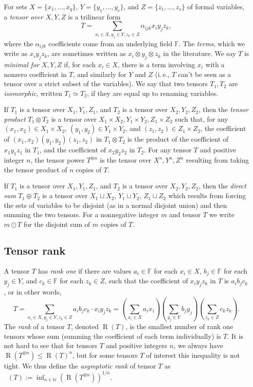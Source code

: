 \documentclass[11pt]{article}
\numberwithin{equation}{section}
\theoremstyle{definition}
\theoremstyle{plain}
\newcommand{\N}{\mathbb N}
\newcommand{\ie}{i.\,e.}
\newcommand{\rr}{\mathop{\operatorname{R}}}
\newcommand{\trr}{\mathop{\tilde{\operatorname{R}}}}
\newcommand{\F}{\mathbb{F}}
\theoremstyle{definition}
\begin{document}
For sets $X = \{x_1, \ldots, x_q\}$, $Y = \{y_1, \ldots, y_r\}$, and $Z = \{z_1, \ldots, z_s \}$ of formal variables, a \emph{tensor over $X,Y,Z$} is a trilinear form
$$T = \sum_{x_i \in X, y_j \in Y, z_k \in Z} \alpha_{ijk} x_i y_j z_k,$$
where the $\alpha_{ijk}$ coefficients come from an underlying field $\F$. The \emph{terms}, which we write as $x_i y_j z_k$, are sometimes written as $x_i\otimes y_j\otimes z_k$ in the literature. We say $T$ is \emph{minimal for} $X,Y,Z$ if, for each $x_i \in X$, there is a term involving $x_i$ with a nonzero coefficient in $T$, and similarly for $Y$ and $Z$ (\ie, $T$ can't be seen as a tensor over a strict subset of the variables). We say that two tensors $T_1, T_2$ are \emph{isomorphic}, written $T_1 \simeq T_2$, if they are equal up to renaming variables.

If $T_1$ is a tensor over $X_1, Y_1, Z_1$, and $T_2$ is a tensor over $X_2, Y_2, Z_2$, then the \emph{tensor product} $T_1 \otimes T_2$ is a tensor over $X_1 \times X_2, Y_1 \times Y_2, Z_1 \times Z_2$ such that, for any $(x_1,x_2) \in X_1 \times X_2$, $(y_1,y_2) \in Y_1 \times Y_2$, and $(z_1,z_2) \in  Z_1 \times Z_2$, the coefficient of $(x_1,x_2)(y_1,y_2)(z_1,z_2)$ in $T_1 \otimes T_2$ is the product of the coefficient of $x_1 y_1 z_1$ in $T_1$, and the coefficient of $x_2 y_2 z_2$ in $T_2$. 
For any tensor $T$ and positive integer $n$, the tensor power $T^{\otimes n}$ is the tensor over $X^n, Y^n, Z^n$ resulting from taking the tensor product of $n$ copies of $T$.

If $T_1$ is a tensor over $X_1, Y_1, Z_1$, and $T_2$ is a tensor over $X_2, Y_2, Z_2$, then the \emph{direct sum} $T_1 \oplus T_2$ is a tensor over $X_1 \sqcup X_2$, $Y_1 \sqcup Y_2$, $Z_1 \sqcup Z_2$ which results from forcing the  
%
sets of variables
to be disjoint (as in a normal disjoint union) and then summing the two tensors. For a nonnegative integer $m$ and tensor $T$ we write $m \odot T$ for the disjoint sum of $m$ copies of $T$.

%
\subsection{Tensor rank}

A tensor $T$ has \emph{rank one} if there are values $a_i \in \F$ for each $x_i \in X$, $b_j \in \F$ for each $y_j \in Y$, and $c_k \in \F$ for each $z_k \in Z$, such that the coefficient of $x_i y_j z_k$ in $T$ is $a_i b_j c_k$, or in other words,
$$T=\sum_{x_i \in X, y_j \in Y, z_k \in Z} a_i b_j c_k \cdot x_i y_j z_k = \left( \sum_{x_i \in X} a_i x_i \right) \left( \sum_{y_j \in Y} b_j y_j \right) \left( \sum_{z_k \in Z} c_k z_k \right).$$
The \emph{rank} of a tensor $T$, denoted $\rr(T)$, is the smallest number of rank one tensors whose sum (summing the coefficient of each term individually) is $T$. It is not hard to see that for tensors $T$ and positive integers $n$, we always have $\rr(T^{\otimes n}) \leq \rr(T)^n$, but for some tensors $T$ of interest this inequality is not tight. We thus define the \emph{asymptotic rank} of tensor $T$ as $\trr(T) := \inf_{n \in \N} (\rr(T^{\otimes n}))^{1/n}$.
\end{document}
